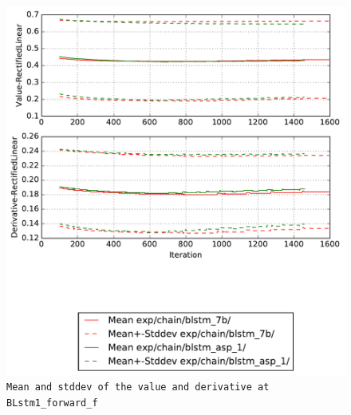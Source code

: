 \documentclass[prl,10pt,twocolumn]{revtex4}
\begin{document}
\newpage
\begin{figure}[h]
  \begin{center}
    \caption{\texttt{Mean and stddev of the value and derivative at BLstm1\_forward\_f}}
    \includegraphics[width=\textwidth]{exp/chain/blstm_7b/report/nonlinstats_BLstm1_forward_f.pdf}
  \end{center}
\end{figure}
\clearpage
\end{document}

